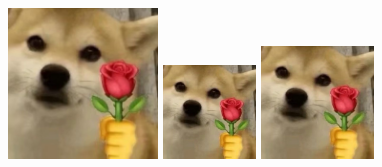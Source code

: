 \documentclass{article}   %
\begin{document}
		\begin{figure}[htbp!]
			\begin{minipage}{0.32\linewidth}
				\centering    
				\includegraphics[height=4cm]{img/sample.png}
			\end{minipage}
			\begin{minipage}{0.32\linewidth}
				\centering    
				\includegraphics[height=2.5cm]{img/sample.png}
			\end{minipage}
			\begin{minipage}{0.32\linewidth}
				\centering
				\includegraphics[height=3cm]{img/sample.png}
			\end{minipage}
		\end{figure}
		
\end{document}
